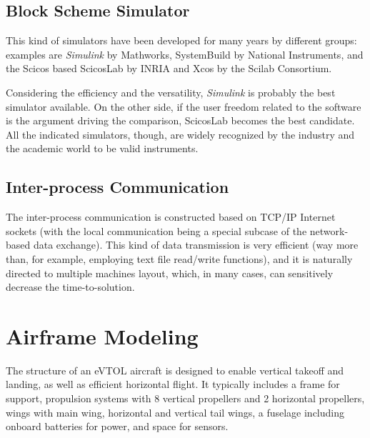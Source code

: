 \subsection{Block Scheme Simulator}

This kind of simulators have been developed for many years by different groups: examples are \textit{Simulink} \cite{Simulink} by Mathworks, SystemBuild \cite{SystemBuild} by National Instruments, and the Scicos \cite{Scicos} based ScicosLab \cite{ScicosLab} by INRIA and Xcos \cite{Xcos} by the Scilab Consortium.

Considering the efficiency and the versatility, \textit{Simulink} is probably the best simulator available. On the other side, if the user freedom related to the software is the argument driving the comparison, ScicosLab becomes the best candidate. All the indicated simulators, though, are widely recognized by the industry and the academic world to be valid instruments.

\subsection{Inter-process Communication}

The inter-process communication is constructed based on TCP/IP Internet sockets (with the local communication being a special subcase of the network-based data exchange). This kind of data transmission is very efficient (way more than, for example, employing text file read/write functions), and it is naturally directed to multiple machines layout, which, in many cases, can sensitively decrease the time-to-solution.

\section{Airframe Modeling}
The structure of an eVTOL aircraft is designed to enable vertical takeoff and landing, as well as efficient horizontal flight. It typically includes a frame for support, propulsion systems with 8 vertical propellers and 2 horizontal propellers, wings with main wing, horizontal and vertical tail wings, a fuselage including onboard batteries for power, and space for sensors.

